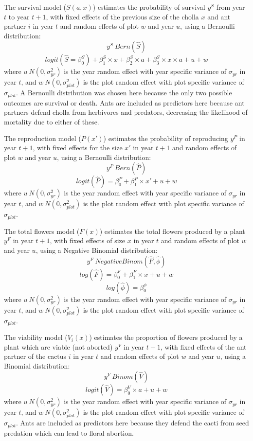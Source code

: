 \documentclass[11pt]{article}
\begin{document}
The survival model ($S(a,x)$) estimates the probability of survival $y^S$ from year $t$ to year $t+1$, with fixed effects of the previous size of the cholla $x$ and ant partner $i$ in year $t$ and random effects of plot $w$ and year $u$, using a Bernoulli distribution:
$$y^S ~ Bern(\hat{S})$$
$$logit(\hat{S} = \beta_{0}^{S}) + \beta_{1}^{S} \times x + \beta_{2}^{S} \times a + \beta_{3}^{S} \times x \times a + u + w$$
where $u ~ N(0,\sigma_{yr}^{2})$ is the year random effect with year specific variance of $\sigma_{yr}$ in year $t$, and $w ~ N(0,\sigma_{plot}^{2})$ is the plot random effect with plot specific variance of $\sigma_{plot}$.
A Bernoulli distribution was chosen here because the only two possible outcomes are survival or death. 
Ants are included as predictors here because ant partners defend cholla from herbivores and predators, decreasing the likelihood of mortality due to either of these. 

The reproduction model ($P(x')$) estimates the probability of reproducing $y^P$ in year $t+1$, with fixed effects for the size $x'$ in year $t+1$ and random effects of plot $w$ and year $u$, using a Bernoulli distribution:
$$y^P ~ Bern(\hat{P})$$
$$logit(\hat{P}) = \beta_{0}^{P} + \beta_{1}^{P} \times x' + u + w$$
where $u ~ N(0,\sigma_{yr}^{2})$ is the year random effect with year specific variance of $\sigma_{yr}$ in year $t$, and $w ~ N(0,\sigma_{plot}^{2})$ is the plot random effect with plot specific variance of $\sigma_{plot}$.

The total flowers model ($F(x)$) estimates the total flowers produced by a plant $y^F$ in year $t+1$, with fixed effects of size $x$ in year $t$ and random effects of plot $w$ and year $u$, using a Negative Binomial distribution:
$$y^{F} ~ Negative Binom(\hat{F},\hat{\phi})$$
$$log(\hat{F}) = \beta_{0}^{F} + \beta_{1}^{F} \times x + u + w$$
$$log(\hat{\phi}) = \beta_{0}^{\phi}$$
where $u ~ N(0,\sigma_{yr}^{2})$ is the year random effect with year specific variance of $\sigma_{yr}$ in year $t$, and $w ~ N(0,\sigma_{plot}^{2})$ is the plot random effect with plot specific variance of $\sigma_{plot}$.

The viability model ($V_i(x)$) estimates the proportion of flowers produced by a plant which are viable (not aborted) $y^V$ in year $t+1$, with fixed effects of the ant partner of the cactus $i$ in year $t$ and random effects of plot $w$ and year $u$, using a Binomial distribution:
$$y^{V} ~ Binom(\hat{V})$$
$$logit(\hat{V}) = \beta_{0}^{V} \times a + u + w$$
where $u ~ N(0,\sigma_{yr}^{2})$ is the year random effect with year specific variance of $\sigma_{yr}$ in year $t$, and $w ~ N(0,\sigma_{plot}^{2})$ is the plot random effect with plot specific variance of $\sigma_{plot}$.
Ants are included as predictors here because they defend the cacti from seed predation which can lead to floral abortion. 
\end{document}
